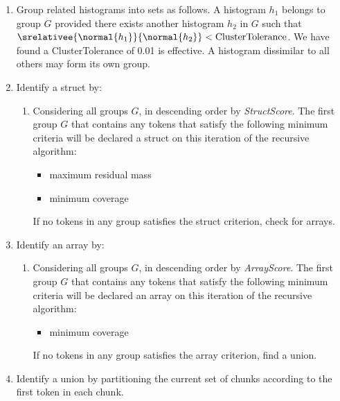 \begin {enumerate}
\item Group related histograms into sets as follows.  
A histogram $h_1$ belongs to
group $G$ provided there exists another histogram $h_2$ in $G$
such that $\srelativee{\normal{h_1}}{\normal{h_2}} < 
\mathrm{ClusterTolerance}$.  We have found a ClusterTolerance
of 0.01 is effective.  A histogram dissimilar to all others may form 
its own group.

\item Identify a struct by:
\begin {enumerate}
\item  Considering all groups $G$, in descending order by {\em StructScore}.
The first group $G$ that contains any tokens that satisfy the
 following minimum criteria will be declared a struct on this 
iteration of the recursive algorithm:
\begin {itemize}
\item maximum residual mass
\item minimum coverage
\end{itemize}
If no tokens in any group satisfies the struct criterion, check for arrays.
\end{enumerate}
\item Identify an array by:
\begin {enumerate}
\item  Considering all groups $G$, in descending order by {\em ArrayScore}.
The first group $G$ that contains any tokens that satisfy the
 following minimum criteria will be declared an array on this 
iteration of the recursive algorithm:
\begin {itemize}
\item minimum coverage
\end{itemize}
If no tokens in any group satisfies the array criterion, find a union.
\end{enumerate}
\item Identify a union by partitioning the current set of chunks according
to the first token in each chunk.
\end{enumerate}

